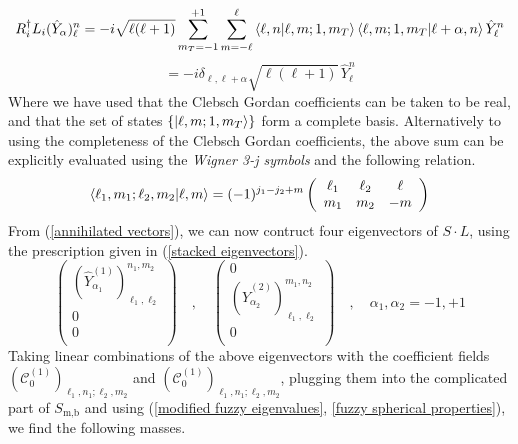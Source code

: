 \newpage
%
%
\begin{equation*}
R_i^\dagger L_i (\hat{Y}_\alpha)^n_{\ell}
=
-i \sqrt{\ell (\ell + 1)} \sum_{m_T = -1}^{+1} \sum_{m=-\ell}^\ell
\braket{\ell,n}{\ell, m ;1,m_T}
\braket{\ell, m ;1,m_T}{\ell+\alpha,n}
\hat{Y}_\ell^{n}
\end{equation*}
%
%
%
%
\begin{equation}\label{annihilated vectors}
= -i \delta_{\ell,\ell+\alpha} \sqrt{\ell (\ell + 1)} \, \hat{Y}_\ell^{n}
\end{equation}
%
%
Where we have used that the Clebsch Gordan coefficients can be taken to be real, and that the set of states $\{ \ket{\ell,m;1,m_T} \}$ form a complete basis. Alternatively to using the completeness of the Clebsch Gordan coefficients, the above sum can be explicitly evaluated using the \textit{Wigner 3-j symbols} and the following relation.
%
%
\begin{equation}
\braket{\ell_1,m_1;\ell_2,m_2}{\ell,m}
=
(-1)^{j_1 - j_2 + m}
\left( \begin{array}{ccc}
\ell_1 & \ell_2 & \ell \\
m_1 & m_2 & -m \\
\end{array} \right)
\end{equation}
%
%
From (\ref{annihilated vectors}), we can now contruct four eigenvectors of $S \cdot L$, using the prescription given in (\ref{stacked eigenvectors}).
%
%
\begin{equation}
\left( \begin{array}{c}
(\hat{Y}^{(1)}_{\alpha_1})^{n_1, m_2}_{\ell_1, \ell_2} \\
0 \\
0 \\
\end{array} \right)
%
\quad , \quad
%
\left( \begin{array}{c}
0 \\
(\hat{Y}^{(2)}_{\alpha_2})^{m_1, n_2}_{\ell_1, \ell_2} \\
0 \\
\end{array} \right)
%
\quad , \quad
%
\alpha_1,\alpha_2 =-1,+1
\end{equation}
%
%
Taking linear combinations of the above eigenvectors with the coefficient fields $(\mathcal{C}^{(1)}_0)_{\ell_1,n_1; \ell_2, m_2}$ and $(\mathcal{C}^{(1)}_0)_{\ell_1,n_1; \ell_2, m_2}$, plugging them into the complicated part of $S_{\text{m,b}}$ and using (\ref{modified fuzzy eigenvalues}, \ref{fuzzy spherical properties}), we find the following masses.
